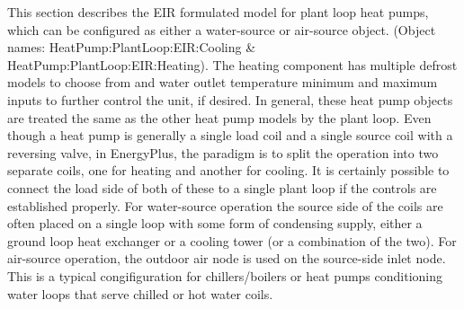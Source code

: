 This section describes the EIR formulated model for plant loop heat pumps, which can be configured as either a water-source or air-source object. (Object names: HeatPump:PlantLoop:EIR:Cooling \& HeatPump:PlantLoop:EIR:Heating). The heating component has multiple defrost models to choose from and water outlet temperature minimum and maximum inputs to further control the unit, if desired. In general, these heat pump objects are treated the same as the other heat pump models by the plant loop.  Even though a heat pump is generally a single load coil and a single source coil with a reversing valve, in EnergyPlus, the paradigm is to split the operation into two separate coils, one for heating and another for cooling.  It is certainly possible to connect the load side of both of these to a single plant loop if the controls are established properly.  For water-source operation the source side of the coils are often placed on a single loop with some form of condensing supply, either a ground loop heat exchanger or a cooling tower (or a combination of the two). For air-source operation, the outdoor air node is used on the source-side inlet node. This is a typical congifiguration for chillers/boilers or heat pumps conditioning water loops that serve chilled or hot water coils.


